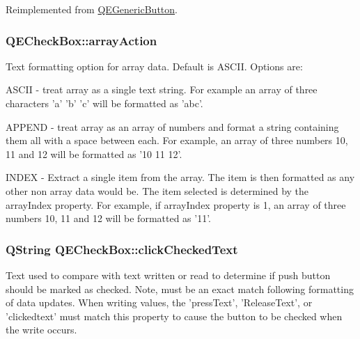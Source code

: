 Reimplemented from \hyperlink{classQEGenericButton}{QEGenericButton}.

\hypertarget{classQECheckBox_a4d3f55ae57f2c8d5b9a315b4ffb5a3b4}{
\subsubsection[{arrayAction}]{ QECheckBox::arrayAction}}
\label{classQECheckBox_a4d3f55ae57f2c8d5b9a315b4ffb5a3b4}
Text formatting option for array data. Default is ASCII. Options are: \begin{DoxyItemize}
\item ASCII -\/ treat array as a single text string. For example an array of three characters 'a' 'b' 'c' will be formatted as 'abc'. \item APPEND -\/ treat array as an array of numbers and format a string containing them all with a space between each. For example, an array of three numbers 10, 11 and 12 will be formatted as '10 11 12'. \item INDEX -\/ Extract a single item from the array. The item is then formatted as any other non array data would be. The item selected is determined by the arrayIndex property. For example, if arrayIndex property is 1, an array of three numbers 10, 11 and 12 will be formatted as '11'. \end{DoxyItemize}
\hypertarget{classQECheckBox_abf6d7c71828fe6e3cd08ed5e15e2c2bd}{
\subsubsection[{clickCheckedText}]{\setlength{\rightskip}{0pt plus 5cm}QString QECheckBox::clickCheckedText}}
\label{classQECheckBox_abf6d7c71828fe6e3cd08ed5e15e2c2bd}
Text used to compare with text written or read to determine if push button should be marked as checked. Note, must be an exact match following formatting of data updates. When writing values, the 'pressText', 'ReleaseText', or 'clickedtext' must match this property to cause the button to be checked when the write occurs.

